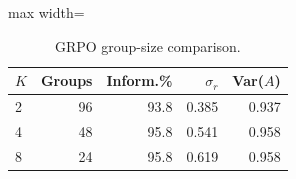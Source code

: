 \begin{table}[!htbp]
\centering
\scriptsize
\setlength{\tabcolsep}{3.4pt}
\begin{adjustbox}{max width=\linewidth}
\begin{tabular}{lrrrr}
\toprule
$K$ & Groups & Inform.\% & $\sigma_r$ & Var($A$) \\
\midrule
2 & 96 & 93.8 & 0.385 & 0.937 \\
4 & 48 & 95.8 & 0.541 & 0.958 \\
8 & 24 & 95.8 & 0.619 & 0.958 \\
\bottomrule
\end{tabular}

\end{adjustbox}
\caption{GRPO group-size comparison.}
\label{tab:grpo-groups}

\end{table}

